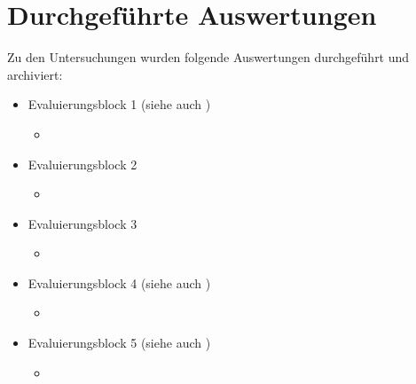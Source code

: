 
\section{Durchgeführte Auswertungen} %
\label{sec:durchgeführte_auswertungen}

Zu den Untersuchungen wurden folgende Auswertungen durchgeführt und archiviert:
\begin{itemize}
	\item Evaluierungsblock 1 (siehe auch \citep{Bohninger10})
		\begin{itemize}
			\item 
		\end{itemize}
	\item Evaluierungsblock 2
		\begin{itemize}
			\item 
		\end{itemize}
	\item Evaluierungsblock 3
		\begin{itemize}
			\item 
		\end{itemize}
	\item Evaluierungsblock 4 (siehe auch \citep{Wahlmuller10})
		\begin{itemize}
			\item 
		\end{itemize}
	\item Evaluierungsblock 5 (siehe auch \citep{Bindreiter10})
		\begin{itemize}
			\item  
		\end{itemize}
\end{itemize}


